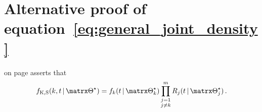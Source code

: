 \documentclass[../main.tex]{subfiles}
\begin{document}
\appendix


\chapter{Alternative proof of equation~\ref{eq:general_joint_density}}
\label{appendix:alternative_joint_proof}
 on page \pageref{eq:general_joint_density} asserts that
\begin{equation*}
    \pdf_{\RV{K}, \sv}(k, t \given \tparam\sysparam) = \pdf_k(t \given \tparam{\sysparam}_k) \prod_{\substack{j=1\\j \neq k}}^{m} \srv_j(t \given \tparam{\sysparam}_j)\,. %
\end{equation*}
\end{document}
